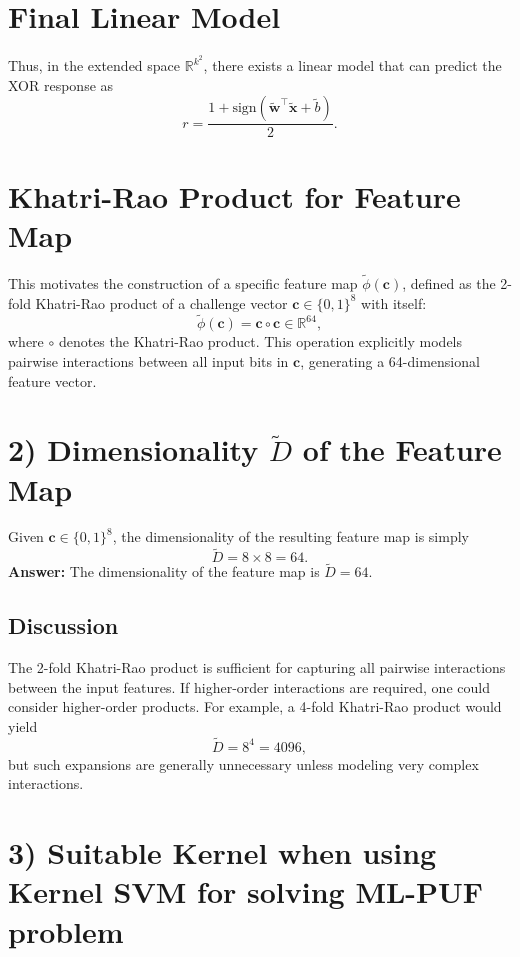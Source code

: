 \documentclass[11pt]{article}
\begin{document}
\section*{Final Linear Model}

Thus, in the extended space \(\mathbb{R}^{k^2}\), there exists a linear model that can predict the XOR response as
\[
r = \frac{1 + \text{sign}(\tilde{\mathbf{w}}^\top \tilde{\mathbf{x}} + \tilde{b})}{2}.
\]

\section*{Khatri-Rao Product for Feature Map}

This motivates the construction of a specific feature map \(\tilde{\phi}(\mathbf{c})\), defined as the 2-fold Khatri-Rao product of a challenge vector \(\mathbf{c} \in \{0,1\}^8\) with itself:
\[
\tilde{\phi}(\mathbf{c}) = \mathbf{c} \circ \mathbf{c} \in \mathbb{R}^{64},
\]
where \(\circ\) denotes the Khatri-Rao product. This operation explicitly models pairwise interactions between all input bits in \(\mathbf{c}\), generating a 64-dimensional feature vector.

\section*{2) Dimensionality \(\tilde{D}\) of the Feature Map}

Given \(\mathbf{c} \in \{0,1\}^8\), the dimensionality of the resulting feature map is simply
\[
\tilde{D} = 8 \times 8 = 64.
\]
\textbf{Answer:} The dimensionality of the feature map is \(\tilde{D} = 64\).

\subsection*{Discussion}

The 2-fold Khatri-Rao product is sufficient for capturing all pairwise interactions between the input features. If higher-order interactions are required, one could consider higher-order products. For example, a 4-fold Khatri-Rao product would yield
\[
\tilde{D} = 8^4 = 4096,
\]
but such expansions are generally unnecessary unless modeling very complex interactions.

\section*{3) Suitable Kernel when using Kernel SVM for solving ML-PUF problem}
\end{document}
